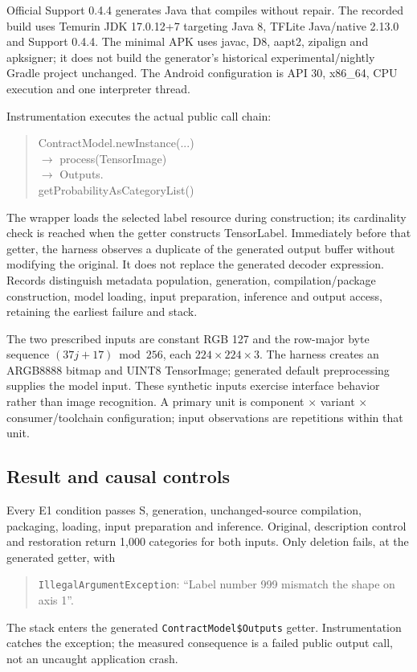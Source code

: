 \documentclass[10pt,conference]{IEEEtran}
\newcommand{\code}[1]{\texttt{#1}}
\begin{document}
Official Support 0.4.4 generates Java that compiles without repair. The recorded build uses Temurin JDK 17.0.12+7 targeting Java 8, TFLite Java/native 2.13.0 and Support 0.4.4. The minimal APK uses javac, D8, aapt2, zipalign and apksigner; it does not build the generator's historical experimental/nightly Gradle project unchanged. The Android configuration is API 30, x86\_64, CPU execution and one interpreter thread.

Instrumentation executes the actual public call chain:
\begin{quote}\small\ttfamily\raggedright
ContractModel.newInstance(...)\\
\quad\(\rightarrow\) process(TensorImage)\\
\quad\(\rightarrow\) Outputs.\\
\hspace*{1.4em}getProbabilityAsCategoryList()
\end{quote}
The wrapper loads the selected label resource during construction; its cardinality check is reached when the getter constructs TensorLabel. Immediately before that getter, the harness observes a duplicate of the generated output buffer without modifying the original. It does not replace the generated decoder expression. Records distinguish metadata population, generation, compilation/package construction, model loading, input preparation, inference and output access, retaining the earliest failure and stack.

The two prescribed inputs are constant RGB 127 and the row-major byte sequence $(37j+17)\bmod256$, each $224\times224\times3$. The harness creates an ARGB8888 bitmap and UINT8 TensorImage; generated default preprocessing supplies the model input. These synthetic inputs exercise interface behavior rather than image recognition. A primary unit is component $\times$ variant $\times$ consumer/toolchain configuration; input observations are repetitions within that unit.

\subsection{Result and causal controls}
Every E1 condition passes S, generation, unchanged-source compilation, packaging, loading, input preparation and inference. Original, description control and restoration return 1,000 categories for both inputs. Only deletion fails, at the generated getter, with
\begin{quote}\small\raggedright
\code{IllegalArgumentException}: ``Label number 999 mismatch the shape on axis 1''.
\end{quote}
The stack enters the generated \code{ContractModel\$Outputs} getter. Instrumentation catches the exception; the measured consequence is a failed public output call, not an uncaught application crash.
\end{document}
